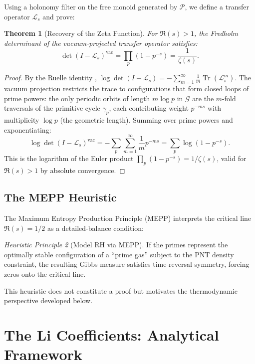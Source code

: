 \documentclass[12pt,a4paper]{article}
\newtheorem{theorem}{Theorem}[section]
\theoremstyle{definition}
\theoremstyle{remark}
\newtheorem{heuristic}[theorem]{Heuristic Principle}
\newcommand{\PP}{\mathcal{P}}
\begin{document}
Using a holonomy filter on the free monoid generated by $\PP$, we define a transfer operator $\mathcal{L}_s$ and prove:

\begin{theorem}[Recovery of the Zeta Function]
\label{thm:vacuum-trace}
For $\Re(s) > 1$, the Fredholm determinant of the vacuum-projected transfer operator satisfies:
\[
\det(I - \mathcal{L}_s)^{\mathrm{vac}} = \prod_p (1 - p^{-s}) = \frac{1}{\zeta(s)}.
\]
\end{theorem}

\begin{proof}
By the Ruelle identity \cite{Ruelle1976}, $\log\det(I - \mathcal{L}_s) = -\sum_{m=1}^\infty \frac{1}{m}\operatorname{Tr}(\mathcal{L}_s^m)$. The vacuum projection restricts the trace to configurations that form closed loops of prime powers: the only periodic orbits of length $m\log p$ in $\mathcal{G}$ are the $m$-fold traversals of the primitive cycle $\gamma_p$, each contributing weight $p^{-ms}$ with multiplicity $\log p$ (the geometric length). Summing over prime powers and exponentiating:
\[
  \log\det(I - \mathcal{L}_s)^{\mathrm{vac}} = -\sum_p \sum_{m=1}^\infty \frac{1}{m} p^{-ms} = \sum_p \log(1 - p^{-s}).
\]
This is the logarithm of the Euler product $\prod_p(1-p^{-s}) = 1/\zeta(s)$, valid for $\Re(s) > 1$ by absolute convergence.
\end{proof}

\subsection{The MEPP Heuristic}

The Maximum Entropy Production Principle (MEPP) interprets the critical line $\Re(s) = 1/2$ as a detailed-balance condition:

\begin{heuristic}[Model RH via MEPP]
If the primes represent the optimally stable configuration of a ``prime gas'' subject to the PNT density constraint, the resulting Gibbs measure satisfies time-reversal symmetry, forcing zeros onto the critical line.
\end{heuristic}

This heuristic does not constitute a proof but motivates the thermodynamic perspective developed below.


\section{The Li Coefficients: Analytical Framework}
\label{sec:li-coefficients}
\end{document}
